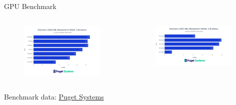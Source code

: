 \begin{frame}{GPU Benchmark}
\begin{columns}
\begin{figure}
\includegraphics[width=0.95\textwidth]{figures/System/pugetbench.jpeg}
\end{figure}
\begin{figure}
\includegraphics[width=0.95\textwidth]{figures/System/pugetbench_pro.jpeg}
\end{figure}
\end{columns}
Benchmark data: \href{https://www.pugetsystems.com/labs/hpc/molecular-dynamics-benchmarks-gpu-roundup-gromacs-namd2-namd-3alpha-on-12-gpus-2330/}{Puget Systems}
\end{frame}

